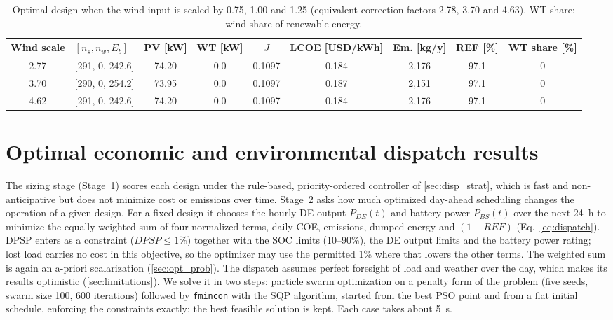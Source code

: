 \documentclass[final,3p,times]{elsarticle}
\begin{document}
\begin{table}[htbp]
\centering
\small
\begin{tabular}{c l c c c c c c c}
\toprule
\textbf{Wind scale} & \textbf{$[n_s, n_w, E_b]$} & \textbf{PV [kW]} & \textbf{WT [kW]} & \textbf{$J$} & \textbf{LCOE [USD/kWh]} & \textbf{Em. [kg/y]} & \textbf{REF [\%]} & \textbf{WT share [\%]} \\
\midrule
2.77 & [291, 0, 242.6] & 74.20 & 0.0 & 0.1097 & 0.184 & 2,176 & 97.1 & 0 \\
3.70 & [290, 0, 254.2] & 73.95 & 0.0 & 0.1097 & 0.187 & 2,151 & 97.1 & 0 \\
4.62 & [291, 0, 242.6] & 74.20 & 0.0 & 0.1097 & 0.184 & 2,176 & 97.1 & 0 \\
\bottomrule
\end{tabular}
\caption{\label{tab:wind_sweep} Optimal design when the wind input is scaled by 0.75, 1.00 and 1.25 (equivalent correction factors 2.78, 3.70 and 4.63). WT share: wind share of renewable energy.}
\end{table}

\section{\label{sec:dispatch_opt} Optimal economic and environmental dispatch results}

The sizing stage (Stage~1) scores each design under the rule-based, priority-ordered controller of \cref{sec:disp_strat}, which is fast and non-anticipative but does not minimize cost or emissions over time. Stage~2 asks how much optimized day-ahead scheduling changes the operation of a given design. For a fixed design it chooses the hourly DE output $P_{DE}(t)$ and battery power $P_{BS}(t)$ over the next 24~h to minimize the equally weighted sum of four normalized terms, daily COE, emissions, dumped energy and $(1-REF)$ (Eq.~\ref{eq:dispatch}). DPSP enters as a constraint ($DPSP \leq 1\%$) together with the SOC limits (10--90\%), the DE output limits and the battery power rating; lost load carries no cost in this objective, so the optimizer may use the permitted 1\% where that lowers the other terms. The weighted sum is again an a-priori scalarization (\cref{sec:opt_prob}). The dispatch assumes perfect foresight of load and weather over the day, which makes its results optimistic (\cref{sec:limitations}). We solve it in two steps: particle swarm optimization on a penalty form of the problem (five seeds, swarm size 100, 600 iterations) followed by \texttt{fmincon} with the SQP algorithm, started from the best PSO point and from a flat initial schedule, enforcing the constraints exactly; the best feasible solution is kept. Each case takes about 5~s.
\end{document}
